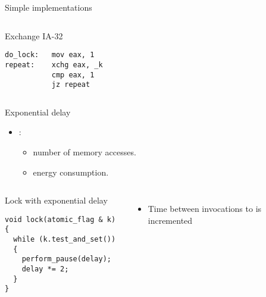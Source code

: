 \begin{frame}[t,fragile]{Simple implementations}

\begin{columns}[T]


\begin{block}{Exchange IA-32}
\begin{lstlisting}[language={[x86masm]Assembler}]
do_lock:   mov eax, 1
repeat:    xchg eax, _k
           cmp eax, 1
           jz repeat
\end{lstlisting}
\end{block}

\end{columns}

\end{frame}

\begin{frame}[t,fragile]{Exponential delay}
\begin{itemize}
  \item {}:
    \begin{itemize}
      \item {} number of memory accesses.
      \item {} energy consumption.
    \end{itemize}
\end{itemize}


\begin{columns}

\begin{block}{Lock with exponential delay}
\begin{lstlisting}
void lock(atomic_flag & k) {
  while (k.test_and_set())
  {
    perform_pause(delay);
    delay *= 2;
  }
}
\end{lstlisting}
\end{block}


\begin{itemize}
  \item Time between invocations to 
        is incremented  
\end{itemize}

\end{columns}

\end{frame}



